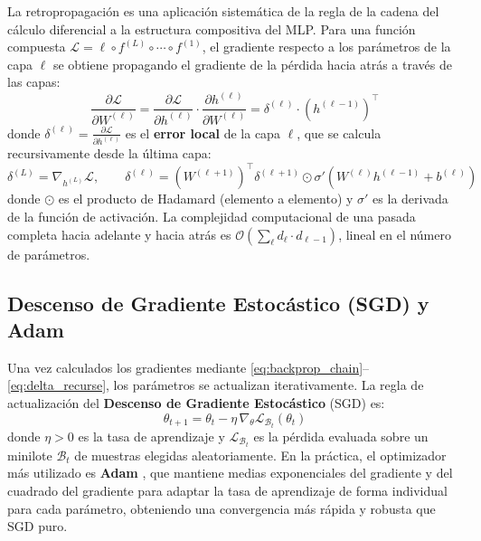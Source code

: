 La retropropagación es una aplicación sistemática de la regla de la cadena del cálculo diferencial a la estructura compositiva del MLP. Para una función compuesta $\mathcal{L} = \ell \circ f^{(L)} \circ \cdots \circ f^{(1)}$, el gradiente respecto a los parámetros de la capa $\ell$ se obtiene propagando el gradiente de la pérdida hacia atrás a través de las capas:
\begin{equation}
\label{eq:backprop_chain}
\frac{\partial \mathcal{L}}{\partial W^{(\ell)}} = \frac{\partial \mathcal{L}}{\partial h^{(\ell)}} \cdot \frac{\partial h^{(\ell)}}{\partial W^{(\ell)}} = \delta^{(\ell)} \cdot \left(h^{(\ell-1)}\right)^\top
\end{equation}
donde $\delta^{(\ell)} = \frac{\partial \mathcal{L}}{\partial h^{(\ell)}}$ es el \textbf{error local} de la capa $\ell$, que se calcula recursivamente desde la última capa:
\begin{equation}
\label{eq:delta_recurse}
\delta^{(L)} = \nabla_{h^{(L)}} \mathcal{L}, \qquad \delta^{(\ell)} = \left(W^{(\ell+1)}\right)^\top \delta^{(\ell+1)} \odot \sigma'\!\left(W^{(\ell)} h^{(\ell-1)} + b^{(\ell)}\right)
\end{equation}
donde $\odot$ es el producto de Hadamard (elemento a elemento) y $\sigma'$ es la derivada de la función de activación. La complejidad computacional de una pasada completa hacia adelante y hacia atrás es $\mathcal{O}\!\left(\sum_\ell d_\ell \cdot d_{\ell-1}\right)$, lineal en el número de parámetros.

\subsection{Descenso de Gradiente Estocástico (SGD) y Adam}
\label{subsec:optimizers}

Una vez calculados los gradientes mediante \eqref{eq:backprop_chain}--\eqref{eq:delta_recurse}, los parámetros se actualizan iterativamente. La regla de actualización del \textbf{Descenso de Gradiente Estocástico} (SGD) es:
\begin{equation}
\label{eq:sgd}
\theta_{t+1} = \theta_t - \eta \, \nabla_\theta \mathcal{L}_{\mathcal{B}_t}(\theta_t)
\end{equation}
donde $\eta > 0$ es la tasa de aprendizaje y $\mathcal{L}_{\mathcal{B}_t}$ es la pérdida evaluada sobre un minilote $\mathcal{B}_t$ de muestras elegidas aleatoriamente. En la práctica, el optimizador más utilizado es \textbf{Adam} \cite{goodfellow2016deep}, que mantiene medias exponenciales del gradiente y del cuadrado del gradiente para adaptar la tasa de aprendizaje de forma individual para cada parámetro, obteniendo una convergencia más rápida y robusta que SGD puro.
